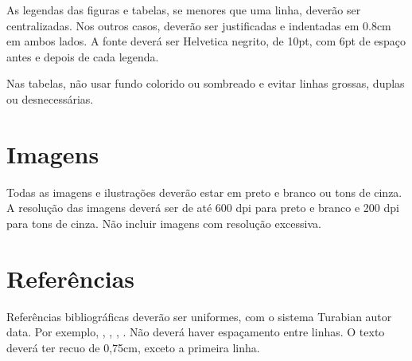 \documentclass[12pt]{article}
\begin{document}
As legendas das figuras e tabelas, se menores que uma linha, deverão
ser centralizadas. Nos outros casos, deverão ser justificadas e
indentadas em 0.8cm em ambos lados. A fonte deverá ser Helvetica
negrito, de 10pt, com 6pt de espaço antes e depois de cada legenda.

Nas tabelas, não usar fundo colorido ou sombreado e evitar linhas
grossas, duplas ou desnecessárias.


\section{Imagens}

Todas as imagens e ilustrações deverão estar em preto e branco ou tons
de cinza. A resolução das imagens deverá ser de até 600 dpi para preto
e branco e 200 dpi para tons de cinza. Não incluir imagens com
resolução excessiva.

\section{Referências}

Referências bibliográficas deverão ser uniformes, com o sistema
Turabian autor data. Por exemplo, \cite{kroger04:desenvolvendo},
\cite{babbitt61:set}, \cite{coutinho.ea05:computational},
\cite{morris87:composition}. Não deverá haver espaçamento entre
linhas. O texto deverá ter recuo de 0,75cm, exceto a primeira linha.


\end{document}
